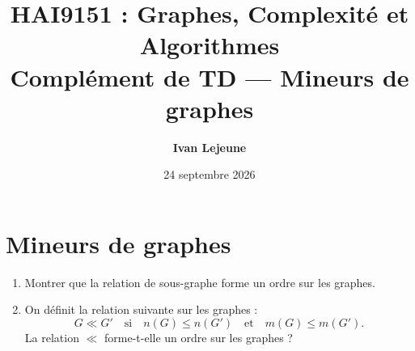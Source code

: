 \documentclass[11pt,a4paper]{article}
\title{\textbf{HAI9151 : Graphes, Complexité et Algorithmes}\\[0.2em]\large Complément de TD — Mineurs de graphes}
\author{\textbf{Ivan Lejeune}}
\date{24 septembre 2026}
\theoremstyle{break}
\begin{document}
\maketitle
\tableofcontents
\vspace{1.5em}

\section{Mineurs de graphes}\label{sec:mineurs-de-graphes}

\begin{td-exo}
    \begin{enumerate}
        \item Montrer que la relation de sous-graphe forme un ordre sur les graphes.
        \item On définit la relation suivante sur les graphes :
        \begin{equation*}
            G \ll G' \quad\text{si}\quad n(G) \le n(G') \quad\text{et}\quad m(G) \le m(G').
        \end{equation*}
        La relation \(\ll\) forme-t-elle un ordre sur les graphes ?
    \end{enumerate}
\end{td-exo}
\end{document}
